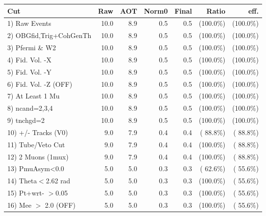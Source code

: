  \begin{table}[h!]\centering
 \begin{tabular}{||l||r|r|r|r|r|r||}
 \hline
 \hline
 Cut & Raw & AOT & Norm0 & Final & Ratio & eff.       \\
 \hline
  1) Raw Events           &         10.0 &          8.9 &          0.5 &          0.5 & (100.0\%) & (100.0\%) \\
  2) OBGfid,Trig+CohGenTh &         10.0 &          8.9 &          0.5 &          0.5 & (100.0\%) & (100.0\%) \\
  3) Pfermi \& W2         &         10.0 &          8.9 &          0.5 &          0.5 & (100.0\%) & (100.0\%) \\
  4) Fid. Vol. -X         &         10.0 &          8.9 &          0.5 &          0.5 & (100.0\%) & (100.0\%) \\
  5) Fid. Vol. -Y         &         10.0 &          8.9 &          0.5 &          0.5 & (100.0\%) & (100.0\%) \\
  6) Fid. Vol. -Z (OFF)   &         10.0 &          8.9 &          0.5 &          0.5 & (100.0\%) & (100.0\%) \\
  7) At Least 1 Mu        &         10.0 &          8.9 &          0.5 &          0.5 & (100.0\%) & (100.0\%) \\
  8) ncand=2,3,4          &         10.0 &          8.9 &          0.5 &          0.5 & (100.0\%) & (100.0\%) \\
  9) tnchgd=2             &         10.0 &          8.9 &          0.5 &          0.5 & (100.0\%) & (100.0\%) \\
 10) +/- Tracks (V0)      &          9.0 &          7.9 &          0.4 &          0.4 & ( 88.8\%) & ( 88.8\%) \\
 11) Tube/Veto Cut        &          9.0 &          7.9 &          0.4 &          0.4 & (100.0\%) & ( 88.8\%) \\
 12) 2 Muons (1mux)       &          9.0 &          7.9 &          0.4 &          0.4 & (100.0\%) & ( 88.8\%) \\
 13) PmuAsym<0.0          &          5.0 &          5.0 &          0.3 &          0.3 & ( 62.6\%) & ( 55.6\%) \\
 14) Theta$<$2.62 rad     &          5.0 &          5.0 &          0.3 &          0.3 & (100.0\%) & ( 55.6\%) \\
 15) Pt+wrt- $>$0.05      &          5.0 &          5.0 &          0.3 &          0.3 & (100.0\%) & ( 55.6\%) \\
 16) Mee $>$ 2.0  (OFF)   &          5.0 &          5.0 &          0.3 &          0.3 & (100.0\%) & ( 55.6\%) \\

\end{tabular}
\end{table}
